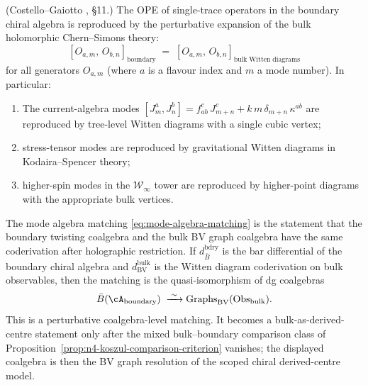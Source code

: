 \begin{proposition}
\label{prop:mode-algebra-matching}
\textup{(Costello--Gaiotto \cite{CG18}, \S11.)}
The OPE of single-trace operators in the boundary chiral algebra is
reproduced by the perturbative expansion of the bulk holomorphic
Chern--Simons theory:
\begin{equation}\label{eq:mode-algebra-matching}
 [O_{a,m},\, O_{b,n}]_{\mathrm{boundary}}
 \;=\;
 [O_{a,m},\, O_{b,n}]_{\mathrm{bulk\;Witten\;diagrams}}
\end{equation}
for all generators $O_{a,m}$ (where $a$ is a flavour index and $m$ a
mode number). In particular:
\begin{enumerate}[label=\textup{(\roman*)},nosep]
\item The current-algebra modes $[J^a_m, J^b_n] = f^{c}_{ab}\,J^c_{m+n}
 + k\,m\,\delta_{m+n}\,\kappa^{ab}$ are reproduced by
 tree-level Witten diagrams with a single cubic vertex;
\item stress-tensor modes are reproduced by gravitational Witten
 diagrams in Kodaira--Spencer theory;
\item higher-spin modes in the $\mathcal{W}_\infty$ tower are
 reproduced by higher-point diagrams with the appropriate bulk
 vertices.
\end{enumerate}
\end{proposition}

\begin{remark}
\label{rem:mode-algebra-bar}
The mode algebra matching \eqref{eq:mode-algebra-matching} is the
statement that the boundary twisting coalgebra and the bulk BV graph
coalgebra have the same coderivation after holographic restriction. If
$d_{\bar{B}}^{\mathrm{bdry}}$ is the bar differential of the boundary
chiral algebra and $d_{\mathrm{BV}}^{\mathrm{bulk}}$ is the Witten
diagram coderivation on bulk observables, then the matching is the
quasi-isomorphism of dg coalgebras
\[
 \bar{B}(\cA_{\mathrm{boundary}})
 \;\xrightarrow{\;\sim\;}
 \mathrm{Graphs}_{\mathrm{BV}}(\Obs_{\mathrm{bulk}}).
\]
This is a perturbative coalgebra-level matching. It becomes a
bulk-as-derived-centre statement only after the mixed
bulk--boundary comparison class of
Proposition~\ref{prop:n4-koszul-comparison-criterion} vanishes; the
displayed coalgebra is then the BV graph resolution of the scoped
chiral derived-centre model.
\end{remark}

